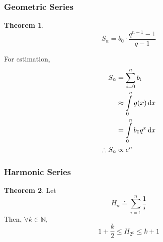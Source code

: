 \documentclass[fleqn, a4paper, 12pt, twoside]{article}
\theoremstyle{definition}
\theoremstyle{theorem}
\newtheorem{theorem}{Theorem}
\begin{document}
\subsubsection{Geometric Series}

\begin{theorem}
	\begin{equation*}
		S_n = b_0 \cdot \dfrac{q^{n + 1} - 1}{q - 1}
	\end{equation*}
\end{theorem}

For estimation,
\begin{align*}
	S_n &= \sum_{i = 0}^{n} b_i\\
	&\approx \int\limits_{0}^{n} g(x) \dif x\\
	&= \int\limits_{0}^{n} b_0 q^x \dif x\\
	\therefore S_n &\propto e^n
\end{align*}

\subsubsection{Harmonic Series}

\begin{theorem}
	Let
	\begin{equation*}
		H_n \doteq \sum_{i = 1}^{n} \dfrac{1}{i}
	\end{equation*}
	Then, $\forall k \in \mathbb{N}$,
	\begin{equation*}
		1 + \dfrac{k}{2} \leq H_{2^k} \leq k + 1
	\end{equation*}
\end{theorem}
\end{document}
